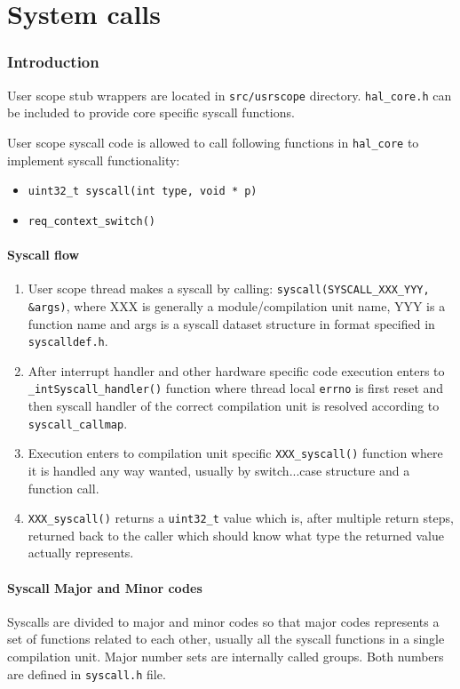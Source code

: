 \part{System calls}

\section{Introduction}
User scope stub wrappers are located in \verb+src/usrscope+ directory. \verb+hal_core.h+
can be included to provide core specific syscall functions.

User scope syscall code is allowed to call following functions in \verb+hal_core+ to
implement syscall functionality:

\begin{itemize}
  \item \verb+uint32_t syscall(int type, void * p)+
  \item \verb+req_context_switch()+
\end{itemize}

\subsection{Syscall flow}

\begin{enumerate}
\item User scope thread makes a syscall by calling:
      \verb+syscall(SYSCALL_XXX_YYY, &args)+, where XXX is generally a
      module/compilation unit name, YYY is a function name and args is a
      syscall dataset structure in format specified in \verb+syscalldef.h+.

\item After interrupt handler and other hardware specific code execution enters
      to \verb+_intSyscall_handler()+ function where thread local \verb+errno+
      is first reset and then syscall handler of the correct compilation unit is
      resolved according to \verb+syscall_callmap+.

\item Execution enters to compilation unit specific \verb+XXX_syscall()+
      function where it is handled any way wanted, usually by switch...case
      structure and a function call.

\item \verb+XXX_syscall()+ returns a \verb+uint32_t+ value which is, after
      multiple return steps, returned back to the caller which should know
      what type the returned value actually represents.
\end{enumerate}


\subsection{Syscall Major and Minor codes}

Syscalls are divided to major and minor codes so that major codes represents a
set of functions related to each other, usually all the syscall functions in a
single compilation unit. Major number sets are internally called groups. Both
numbers are defined in \verb+syscall.h+ file.
